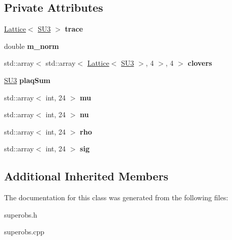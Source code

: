 \subsection*{Private Attributes}
\begin{DoxyCompactItemize}
\item 
\hyperlink{classLattice}{Lattice}$<$ \hyperlink{structSU3}{S\+U3} $>$ {\bfseries trace}\hypertarget{classSuperObs_aa3810a233cc5ba81920b26c05b69fec2}{}\label{classSuperObs_aa3810a233cc5ba81920b26c05b69fec2}

\item 
double {\bfseries m\+\_\+norm}\hypertarget{classSuperObs_aee29fc04affddd9b71d918f5b36dbe17}{}\label{classSuperObs_aee29fc04affddd9b71d918f5b36dbe17}

\item 
std\+::array$<$ std\+::array$<$ \hyperlink{classLattice}{Lattice}$<$ \hyperlink{structSU3}{S\+U3} $>$, 4 $>$, 4 $>$ {\bfseries clovers}\hypertarget{classSuperObs_ab59fe1a306183d36cf2c2f706d5f4b97}{}\label{classSuperObs_ab59fe1a306183d36cf2c2f706d5f4b97}

\item 
\hyperlink{structSU3}{S\+U3} {\bfseries plaq\+Sum}\hypertarget{classSuperObs_a66390e1acca325f4d505ff0db24f97b5}{}\label{classSuperObs_a66390e1acca325f4d505ff0db24f97b5}

\item 
std\+::array$<$ int, 24 $>$ {\bfseries mu}\hypertarget{classSuperObs_a69bfdb7e90d9c9c0cf156b3e0e635b14}{}\label{classSuperObs_a69bfdb7e90d9c9c0cf156b3e0e635b14}

\item 
std\+::array$<$ int, 24 $>$ {\bfseries nu}\hypertarget{classSuperObs_ae49098e2ed19e81871c3ff399911e5f4}{}\label{classSuperObs_ae49098e2ed19e81871c3ff399911e5f4}

\item 
std\+::array$<$ int, 24 $>$ {\bfseries rho}\hypertarget{classSuperObs_a58a715a80aad21518378806174d241dd}{}\label{classSuperObs_a58a715a80aad21518378806174d241dd}

\item 
std\+::array$<$ int, 24 $>$ {\bfseries sig}\hypertarget{classSuperObs_a460981ed26aa39f24d7a8da65d8813ec}{}\label{classSuperObs_a460981ed26aa39f24d7a8da65d8813ec}

\end{DoxyCompactItemize}
\subsection*{Additional Inherited Members}


The documentation for this class was generated from the following files\+:\begin{DoxyCompactItemize}
\item 
superobs.\+h\item 
superobs.\+cpp\end{DoxyCompactItemize}
